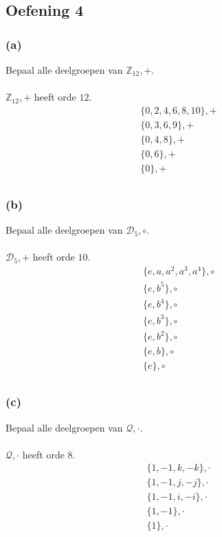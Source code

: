 \documentclass[main.tex]{subfiles}
\begin{document}
\subsection*{Oefening 4}
\label{oza:oz1-oef4}

\subsubsection*{(a)}
Bepaal alle deelgroepen van $\mathbb{Z}_{12},+$.\\\\
$\mathbb{Z}_{12},+$ heeft orde $12$.
\[
\begin{array}{c}
  \{ 0,2,4,6,8,10 \},+\\
  \{ 0,3,6,9 \},+\\
  \{ 0,4,8 \},+\\
  \{ 0,6 \},+\\
  \{ 0 \},+\\
\end{array}
\]

\subsubsection*{(b)}
Bepaal alle deelgroepen van $\mathcal{D}_{5},\circ$.\\\\
$\mathcal{D}_{5},+$ heeft orde $10$.
\[
\begin{array}{c}
  \{ e, a, a^{2}, a^{3}, a^{4} \},\circ\\
  \{ e, b^{5} \},\circ\\
  \{ e, b^{4} \},\circ\\
  \{ e, b^{3} \},\circ\\
  \{ e, b^{2} \},\circ\\
  \{ e, b \},\circ\\
  \{ e \},\circ\\
\end{array}
\]

\subsubsection*{(c)}
Bepaal alle deelgroepen van $\mathcal{Q},\cdot$.\\\\
$\mathcal{Q},\cdot$ heeft orde $8$.
\[
\begin{array}{c}
  \{ 1, -1, k, -k \},\cdot\\
  \{ 1, -1, j, -j \},\cdot\\
  \{ 1, -1, i, -i \},\cdot\\
  \{ 1, -1 \},\cdot\\
  \{ 1 \},\cdot\\
\end{array}
\]
\end{document}
